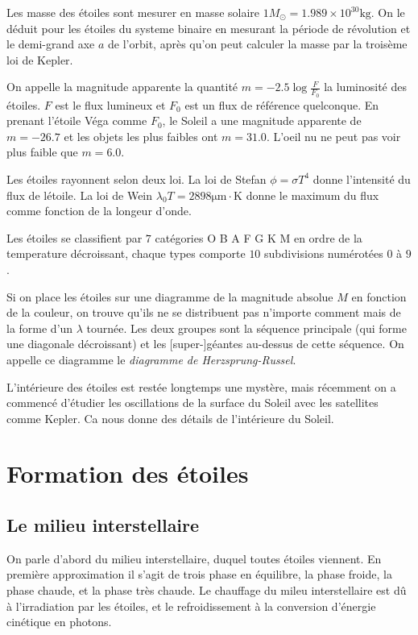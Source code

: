 \documentclass[10pt]{report}
\newcommand{\scinot}[2]{#1\times 10^{#2}}
\begin{document}
Les masse des \'etoiles sont mesurer en masse solaire $1 M_{\odot} = \scinot{1.989}{30}\mathrm{kg}$. On le d\'eduit pour les \'etoiles du systeme binaire en mesurant la p\'eriode de r\'evolution et le demi-grand axe $a$ de l'orbit, apr\`es qu'on peut calculer la masse par la trois\`eme loi de Kepler. 

On appelle la magnitude apparente la quantit\'e $m = -2.5\log \frac{F}{F_0}$ la luminosit\'e des \'etoiles. $F$ est le flux lumineux et $F_0$ est un flux de r\'ef\'erence quelconque. En prenant l'\'etoile V\'ega comme $F_0$, le Soleil a une magnitude apparente de $m=-26.7$ et les objets les plus faibles ont $m=31.0$. L'oeil nu ne peut pas voir plus faible que $m=6.0$.

Les \'etoiles rayonnent selon deux loi. La loi de Stefan $\phi = \sigma T^4$ donne l'intensit\'e du flux de l\'etoile. La loi de Wein $\lambda_0 T = 2898\mathrm{\mu m \cdot K}$ donne le maximum du flux comme fonction de la longeur d'onde.

Les \'etoiles se classifient par $7$ cat\'egories O B A F G K M en ordre de la temperature d\'ecroissant, chaque types comporte $10$ subdivisions num\'erot\'ees $0$ \`a $9$.

Si on place les \'etoiles sur une diagramme de la magnitude absolue $M$ en fonction de la couleur, on trouve qu'ils ne se distribuent pas n'importe comment mais de la forme d'un $\lambda$ tourn\'ee. Les deux groupes sont la s\'equence principale (qui forme une diagonale d\'ecroissant) et les [super-]g\'eantes au-dessus de cette s\'equence. On appelle ce diagramme le \emph{diagramme de Herzsprung-Russel}. 

L'int\'erieure des \'etoiles est rest\'ee longtemps une myst\`ere, mais r\'ecemment on a commenc\'e d'\'etudier les oscillations de la surface du Soleil avec les satellites comme Kepler. Ca nous donne des d\'etails de l'int\'erieure du Soleil.

\section{Formation des \'etoiles}

\subsection{Le milieu interstellaire}

On parle d'abord du milieu interstellaire, duquel toutes \'etoiles viennent. En premi\`ere approximation il s'agit de trois phase en \'equilibre, la phase froide, la phase chaude, et la phase tr\`es chaude. Le chauffage du mileu interstellaire est d\^u \`a l'irradiation par les \'etoiles, et le refroidissement \`a la conversion d'\'energie cin\'etique en photons. 
\end{document}
